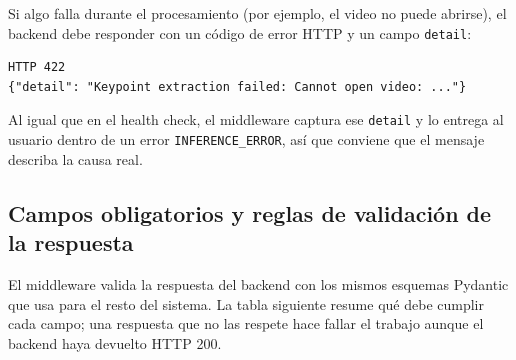 \documentclass[12pt,a4paper]{article}
\begin{document}
Si algo falla durante el procesamiento (por ejemplo, el video no puede abrirse), el backend debe responder con un código de error HTTP y un campo \texttt{detail}:

\begin{center}
\begin{minipage}{0.9\textwidth}
\small
\begin{Verbatim}[baselinestretch=0.9]
HTTP 422
{"detail": "Keypoint extraction failed: Cannot open video: ..."}
\end{Verbatim}
\end{minipage}
\end{center}

Al igual que en el health check, el middleware captura ese \texttt{detail} y lo entrega al usuario dentro de un error \texttt{INFERENCE\_ERROR}, así que conviene que el mensaje describa la causa real.

\subsection{Campos obligatorios y reglas de validación de la respuesta}

El middleware valida la respuesta del backend con los mismos esquemas Pydantic que usa para el resto del sistema. La tabla siguiente resume qué debe cumplir cada campo; una respuesta que no las respete hace fallar el trabajo aunque el backend haya devuelto HTTP 200.
\end{document}
